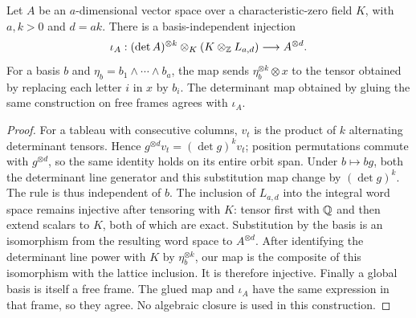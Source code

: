 \begin{lemma}
\label{lem:rectangular-determinant-map}
\leanok
Let $A$ be an $a$-dimensional vector space over a characteristic-zero
field $K$, with $a,k>0$ and $d=ak$. There is a basis-independent injection
\[
 \iota_A:(\det A)^{\otimes k}\otimes_K(K\otimes_\mathbb Z L_{a,d})
     \longrightarrow A^{\otimes d}.
\]
For a basis $b$ and $\eta_b=b_1\wedge\cdots\wedge b_a$, the map sends
$\eta_b^{\otimes k}\otimes x$ to the tensor obtained by replacing each
letter $i$ in $x$ by $b_i$. The determinant map obtained by gluing the
same construction on free frames agrees with $\iota_A$.
\end{lemma}
\begin{proof}
For a tableau with consecutive columns, $v_t$ is the product of $k$
alternating determinant tensors. Hence $g^{\otimes d}v_t=(\det g)^kv_t$;
position permutations commute with $g^{\otimes d}$, so the same identity
holds on its entire orbit span. Under $b\mapsto bg$, both the determinant
line generator and this substitution map change by $(\det g)^k$. The
rule is thus independent of $b$. The inclusion of $L_{a,d}$ into the
integral word space remains injective after tensoring with $K$: tensor
first with $\mathbb Q$ and then extend scalars to $K$, both of which are exact.
Substitution by the basis is an isomorphism from the resulting word
space to $A^{\otimes d}$. After identifying the determinant line power
with $K$ by $\eta_b^{\otimes k}$, our map is the composite of this
isomorphism with the lattice inclusion. It is therefore injective.
Finally a global basis is itself a free frame. The glued map and
$\iota_A$ have the same expression in that frame, so they agree.
No algebraic closure is used in this construction.
\end{proof}

